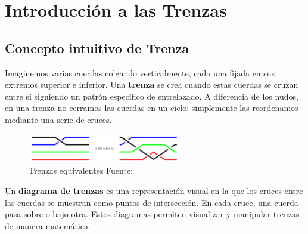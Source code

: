 \chapter{Introducción a las Trenzas}
\label{ch::capitulo1}

\section{Concepto intuitivo de Trenza}

Imaginemos varias cuerdas colgando verticalmente, cada una fijada en sus extremos superior e inferior. Una \textbf{trenza} se crea cuando estas cuerdas se cruzan entre sí siguiendo un patrón específico de entrelazado. A diferencia de los nudos, en una trenza no cerramos las cuerdas en un ciclo; simplemente las reordenamos mediante una serie de cruces.

\begin{figure}[h!]
    \centering
    \includegraphics[width=0.6\textwidth]{figures/chapters/1_def_grupo/trenzas_equivalentes.png}
    \caption{Trenzas equivalentes Fuente: \cite{ArithmeticBraids}}
\end{figure}

Un \textbf{diagrama de trenzas} es una representación visual en la que los cruces entre las cuerdas se muestran como puntos de intersección. En cada cruce, una cuerda pasa sobre o bajo otra. Estos diagramas permiten visualizar y manipular trenzas de manera matemática.





